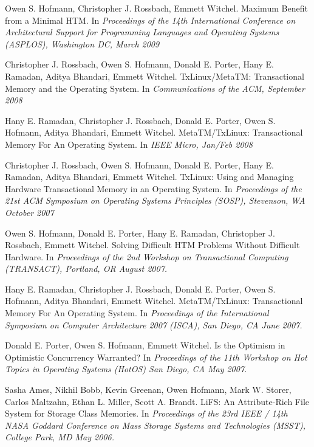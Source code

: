 \documentclass[10pt]{article}
\makeatletter
\newlength{\bibhang}
\newlength{\bibsep}
 {\@listi \global\bibsep\itemsep \global\advance\bibsep by\parsep}
\newenvironment{bibsection}
    {\list{}{%
        \setlength{\leftmargin}{\bibhang}%
        \setlength{\itemindent}{-\leftmargin}%
        \setlength{\itemsep}{\bibsep}%
        \setlength{\parsep}{\z@}%
        }}
    {\endlist}
\makeatother
\begin{document}
\begin{bibsection}
\item Owen S. Hofmann, Christopher J. Rossbach, Emmett Witchel.
Maximum Benefit from a Minimal HTM.
In \emph{Proceedings of the 14th International Conference on Architectural
Support for Programming Languages and Operating Systems (ASPLOS),
Washington DC, March 2009} 
 
\item Christopher J. Rossbach, Owen S. Hofmann, Donald E. Porter, Hany E.
Ramadan, Aditya Bhandari, Emmett Witchel.
TxLinux/MetaTM: Transactional Memory and the Operating System.
In \emph{Communications of the ACM, September 2008} 
 
\item Hany E. Ramadan, Christopher J. Rossbach, Donald E. Porter, Owen S.
Hofmann, Aditya Bhandari, Emmett Witchel.
MetaTM/TxLinux: Transactional Memory For An Operating System.
 In \emph{IEEE Micro, Jan/Feb 2008}
 
\item Christopher J. Rossbach, Owen S. Hofmann, Donald E. Porter, Hany E.
Ramadan, Aditya Bhandari, Emmett Witchel.
TxLinux: Using and Managing Hardware Transactional Memory in an
Operating System.
In \emph{Proceedings of the 21st ACM Symposium on Operating Systems
Principles (SOSP), Stevenson, WA October 2007} 
 
\item Owen S. Hofmann, Donald E. Porter, Hany E. Ramadan, Christopher J.
Rossbach, Emmett Witchel.
Solving Difficult HTM Problems Without Difficult Hardware.
In \emph{Proceedings of the 2nd Workshop on Transactional Computing
(TRANSACT), Portland, OR August 2007.} 
 
\item Hany E. Ramadan, Christopher J. Rossbach, Donald E. Porter, Owen S.
Hofmann, Aditya Bhandari, Emmett Witchel.
MetaTM/TxLinux: Transactional Memory For An Operating System.
In \emph{Proceedings of the International Symposium on Computer
Architecture 2007 (ISCA), San Diego, CA June 2007.} 
 
\item Donald E. Porter, Owen S. Hofmann, Emmett Witchel.
Is the Optimism in Optimistic Concurrency Warranted? 
In \emph{Proceedings of the 11th Workshop on Hot Topics in Operating
Systems (HotOS) San Diego, CA May 2007.} 
 
\item Sasha Ames, Nikhil Bobb, Kevin Greenan, Owen Hofmann, Mark W. Storer,
Carlos Maltzahn, Ethan L. Miller, Scott A. Brandt.
LiFS: An Attribute-Rich File System for Storage Class Memories.
In \emph{Proceedings of the 23rd IEEE / 14th NASA Goddard Conference on
Mass Storage Systems and Technologies (MSST), College Park, MD May
2006.} 
\end{bibsection}
\end{document}
